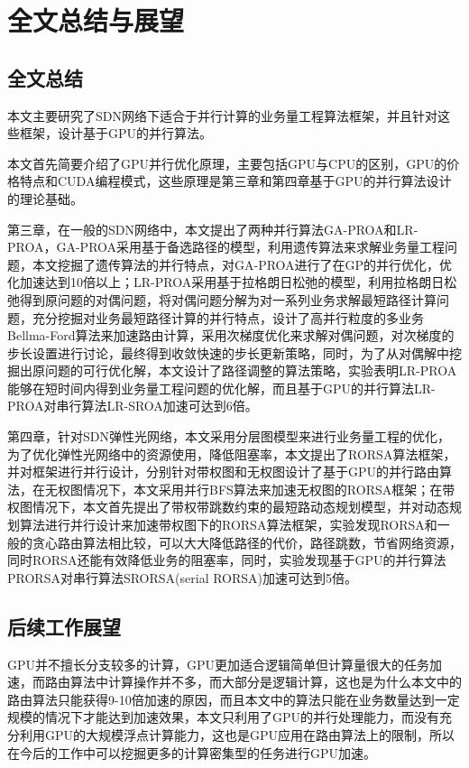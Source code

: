 \documentclass[master]{thesis-uestc}
\begin{document}
\chapter{全文总结与展望}
\section{全文总结}
本文主要研究了SDN网络下适合于并行计算的业务量工程算法框架，并且针对这些框架，设计基于GPU的并行算法。

本文首先简要介绍了GPU并行优化原理，主要包括GPU与CPU的区别，GPU的价格特点和CUDA编程模式，这些原理是第三章和第四章基于GPU的并行算法设计的理论基础。

第三章，在一般的SDN网络中，本文提出了两种并行算法GA-PROA和LR-PROA，GA-PROA采用基于备选路径的模型，利用遗传算法来求解业务量工程问题，本文挖掘了遗传算法的并行特点，对GA-PROA进行了在GP的并行优化，优化加速达到10倍以上；LR-PROA采用基于拉格朗日松弛的模型，利用拉格朗日松弛得到原问题的对偶问题，将对偶问题分解为对一系列业务求解最短路径计算问题，充分挖掘对业务最短路径计算的并行特点，设计了高并行粒度的多业务Bellma-Ford算法来加速路由计算，采用次梯度优化来求解对偶问题，对次梯度的步长设置进行讨论，最终得到收敛快速的步长更新策略，同时，为了从对偶解中挖掘出原问题的可行优化解，本文设计了路径调整的算法策略，实验表明LR-PROA能够在短时间内得到业务量工程问题的优化解，而且基于GPU的并行算法LR-PROA对串行算法LR-SROA加速可达到6倍。

第四章，针对SDN弹性光网络，本文采用分层图模型来进行业务量工程的优化，为了优化弹性光网络中的资源使用，降低阻塞率，本文提出了RORSA算法框架，并对框架进行并行设计，分别针对带权图和无权图设计了基于GPU的并行路由算法，在无权图情况下，本文采用并行BFS算法来加速无权图的RORSA框架；在带权图情况下，本文首先提出了带权带跳数约束的最短路动态规划模型，并对动态规划算法进行并行设计来加速带权图下的RORSA算法框架，实验发现RORSA和一般的贪心路由算法相比较，可以大大降低路径的代价，路径跳数，节省网络资源，同时RORSA还能有效降低业务的阻塞率，同时，实验发现基于GPU的并行算法PRORSA对串行算法SRORSA(serial RORSA)加速可达到5倍。

\section{后续工作展望}
GPU并不擅长分支较多的计算，GPU更加适合逻辑简单但计算量很大的任务加速，而路由算法中计算操作并不多，而大部分是逻辑计算，这也是为什么本文中的路由算法只能获得9-10倍加速的原因，而且本文中的算法只能在业务数量达到一定规模的情况下才能达到加速效果，本文只利用了GPU的并行处理能力，而没有充分利用GPU的大规模浮点计算能力，这也是GPU应用在路由算法上的限制，所以在今后的工作中可以挖掘更多的计算密集型的任务进行GPU加速。
\end{document}
